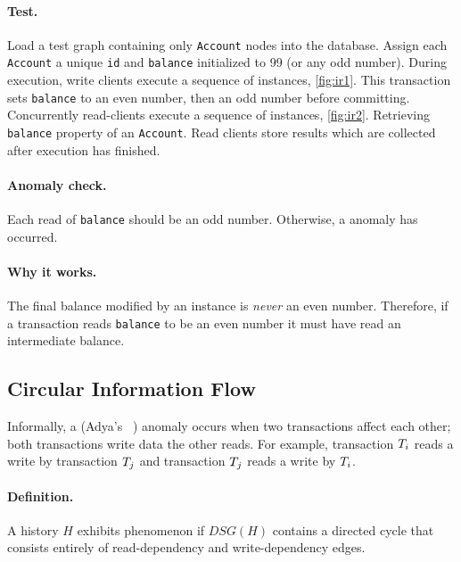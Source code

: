 \paragraph{Test.}
Load a test graph containing only \texttt{Account} nodes into the database. 
Assign each \texttt{Account} a unique \texttt{id} and \texttt{balance} 
initialized to 99 (or any odd number). During execution, write clients execute a
sequence of  instances, \autoref{fig:ir1}. This 
transaction sets \texttt{balance} to an even number, then an odd number before 
committing. Concurrently read-clients execute a sequence of 
 instances, \autoref{fig:ir2}. Retrieving 
\texttt{balance} property of an \texttt{Account}. Read clients store results 
which are collected after execution has finished.

\paragraph{Anomaly check.}
Each read of \texttt{balance} should be an odd number.
Otherwise, a  anomaly has occurred.

\paragraph{Why it works.}
The final balance modified by an  instance is 
\emph{never} an even number. Therefore, if a transaction reads \texttt{balance} 
to be an even number it must have read an intermediate balance.

\subsection*{Circular Information Flow}

Informally, a  (Adya's ~\cite{adya1999weak})
anomaly occurs when two transactions affect each other; \ie both transactions
write data the other reads. For example, transaction $T_i$ reads a 
write by transaction $T_j$ and transaction $T_j$ reads a write by $T_i$.

\paragraph{Definition.}
A history $H$ exhibits phenomenon  if $\textit{DSG}(H)$ contains a 
directed cycle that consists entirely of read-dependency and write-dependency edges.

